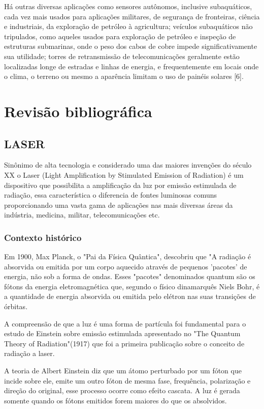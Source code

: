 \documentclass{fei}
\begin{document}
Há outras diversas aplicações como sensores autônomos, inclusive subaquáticos, cada vez mais usados para aplicações militares, de segurança de fronteiras, ciência e industriais, da exploração de petróleo à agricultura; veículos subaquáticos não tripulados, como aqueles usados para exploração de petróleo e inspeção de estruturas submarinas, onde o peso dos cabos de cobre impede significativamente sua utilidade; torres de retransmissão de telecomunicações geralmente estão localizadas longe de estradas e linhas de energia, e frequentemente em locais onde o clima, o terreno ou mesmo a aparência limitam o uso de painéis solares [6].

\chapter{Revisão bibliográfica}

\section{LASER}

Sinônimo de alta tecnologia e considerado uma das maiores invenções do século XX o Laser (Light Amplification by Stimulated Emission of Radiation) é um dispositivo que possibilita a amplificação da luz por emissão estimulada de radiação, essa característica o diferencia de fontes luminosas comuns proporcionando uma vasta gama de aplicações nas mais diversas áreas da indústria, medicina, militar, telecomunicações etc.

\subsection{Contexto histórico}

Em 1900, Max Planck, o "Pai da Física Quântica", descobriu que "A radiação é absorvida ou emitida por um corpo aquecido através de pequenos 'pacotes' de energia, não sob a forma de ondas. Esses "pacotes" denominados quantum são os fótons da energia eletromagnética que, segundo o físico dinamarquês Niels Bohr, é a quantidade de energia absorvida ou emitida pelo elétron nas suas transições de órbitas.

A compreensão de que a luz é uma forma de partícula foi fundamental para o estudo de Einstein sobre emissão estimulada apresentado no "The Quantum Theory of Radiation"(1917) que foi a primeira publicação sobre o conceito de radiação a laser.

A teoria de Albert Einstein diz que um átomo perturbado por um fóton que incide sobre ele, emite um outro fóton de mesma fase, frequência, polarização e direção do original, esse processo ocorre como efeito cascata. A luz é gerada somente quando os fótons emitidos forem maiores do que os absolvidos.
\end{document}
